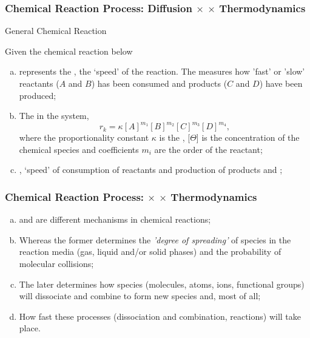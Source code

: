 \documentclass[10pt,compress,unknownkeysallowed]{beamer}
\begin{document}
\begin{frame}
  \frametitle{Chemical Reaction Process: Diffusion $\times$  $\times$ Thermodynamics}

  \begin{block}{\begin{center}General Chemical Reaction\end{center}}
     Given the chemical reaction below
  \end{block}  

   \begin{enumerate}[a)]
       \item<1->  represents the , \ie the `speed' of the reaction. The  measures how 'fast' or 'slow' reactants ($A$ and $B$) has been consumed and products ($C$ and $D$) have been produced;
       \item<2-> The  in the system, \eg
             \begin{displaymath}
                  r_{k} = \kappa [A]^{m_{1}}[B]^{m_{2}}[C]^{m_{3}}[D]^{m_{4}},
             \end{displaymath}
             where the proportionality constant $\kappa$ is the , [$\Theta$] is the concentration of the chemical species and coefficients $m_{i}$ are the order of the reactant;
       \item<3-> , \ie `speed' of consumption of reactants and production of products and ;
   \end{enumerate}
\end{frame}
\normalsize

\begin{frame}
  \frametitle{Chemical Reaction Process:  $\times$  $\times$ Thermodynamics}


   \begin{enumerate}[a)]
       \item<1->  and  are different mechanisms in chemical reactions;
       \item<2-> Whereas the former determines the {\it 'degree of spreading'} of species in the reaction media (\ie gas, liquid and/or solid phases) and the probability of molecular collisions;
       \item<3-> The later determines how species (\ie molecules, atoms, ions, functional groups) will dissociate and combine to form new species and, most of all;
        \item<4-> How fast these processes (dissociation and combination, \ie reactions) will take place.
   \end{enumerate}
\end{frame}
\normalsize
\end{document}
